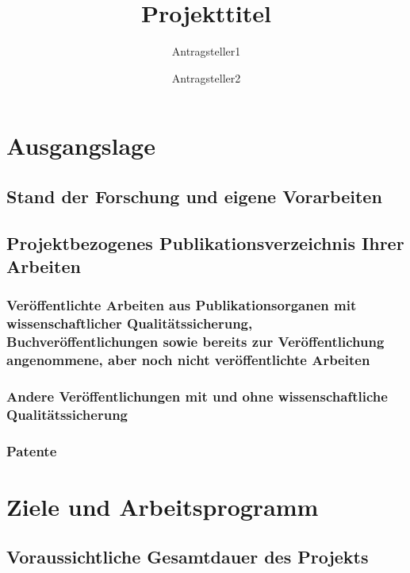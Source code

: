 \documentclass[de]{dfg-proposal}
\begin{document}
    \title{Projekttitel}
    \author{Antragsteller1 \and Antragsteller2}


    \maketitle


    \section{Ausgangslage}\label{sec:ausgangslage}

        \subsection{Stand der Forschung und eigene Vorarbeiten}

        \subsection{Projektbezogenes Publikationsverzeichnis Ihrer Arbeiten}

            \subsubsection{Veröffentlichte Arbeiten aus Publikationsorganen mit wissenschaftlicher Qualitätssicherung, Buchveröffentlichungen sowie bereits zur Veröffentlichung angenommene, aber noch nicht veröffentlichte Arbeiten}

            \subsubsection{Andere Veröffentlichungen mit und ohne wissenschaftliche Qualitätssicherung}

            \subsubsection{Patente}


    \section{Ziele und Arbeitsprogramm}\label{sec:ziele-und-arbeitsprogramm}

        \subsection{Voraussichtliche Gesamtdauer des Projekts}
\end{document}
